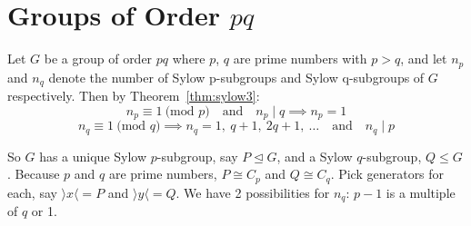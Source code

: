 \documentclass[a4paper, oneside, 12pt, final]{article}
\theoremstyle{definition}
\DeclareMathOperator{\z}{Z}
\DeclareMathOperator{\C}{C}
\begin{document}
%
%
%
%
%
%

\section{Groups of Order \(pq\)}
Let \(G\) be a group of order \(pq\) where \(p\), \(q\) are prime numbers with \(p > q\), and let \(n_p\) and \(n_q\)
denote the number of Sylow p-subgroups and Sylow q-subgroups of \(G\) respectively.
Then by Theorem~\ref{thm:sylow3}:
\[n_p \equiv 1 \ \text{(mod \(p\))} \quad \text{and} \quad n_p \mid q \implies n_p = 1\]
\[n_q \equiv 1 \ \text{(mod \(q\))} \implies n_q = 1,\ q+1,\ 2q+1,\ \dots \quad \text{and} \quad n_q \mid p\]

So \(G\) has a unique Sylow \(p\)-subgroup, say \(P \unlhd G\), and a Sylow \(q\)-subgroup, \(Q \leqslant G\).
Because \(p\) and \(q\) are prime numbers, \(P \cong C_p\) and \(Q \cong C_q\).
Pick generators for each, say \(\rangle x \langle  = P\) and \(\rangle y \langle = Q\).
We have 2 possibilities for \(n_q\): \(p-1\) is a multiple of \(q\) or 1.
\end{document}
